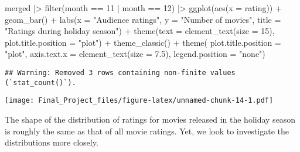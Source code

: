 \documentclass[
]{article}
\newenvironment{Shaded}{\begin{snugshade}}{\end{snugshade}}
\newcommand{\AttributeTok}[1]{\textcolor[rgb]{0.77,0.63,0.00}{#1}}
\newcommand{\DecValTok}[1]{\textcolor[rgb]{0.00,0.00,0.81}{#1}}
\newcommand{\FloatTok}[1]{\textcolor[rgb]{0.00,0.00,0.81}{#1}}
\newcommand{\FunctionTok}[1]{\textcolor[rgb]{0.00,0.00,0.00}{#1}}
\newcommand{\NormalTok}[1]{#1}
\newcommand{\SpecialCharTok}[1]{\textcolor[rgb]{0.00,0.00,0.00}{#1}}
\newcommand{\StringTok}[1]{\textcolor[rgb]{0.31,0.60,0.02}{#1}}
\begin{document}
\begin{Shaded}
\begin{Highlighting}[]
\NormalTok{merged }\SpecialCharTok{|\textgreater{}}
  \FunctionTok{filter}\NormalTok{(month }\SpecialCharTok{==} \DecValTok{11} \SpecialCharTok{|}\NormalTok{ month }\SpecialCharTok{==} \DecValTok{12}\NormalTok{) }\SpecialCharTok{|\textgreater{}}
  \FunctionTok{ggplot}\NormalTok{(}\FunctionTok{aes}\NormalTok{(}\AttributeTok{x =}\NormalTok{ rating)) }\SpecialCharTok{+}
  \FunctionTok{geom\_bar}\NormalTok{() }\SpecialCharTok{+}
  \FunctionTok{labs}\NormalTok{(}\AttributeTok{x =} \StringTok{"Audience ratings"}\NormalTok{,}
       \AttributeTok{y =} \StringTok{"Number of movies"}\NormalTok{,}
       \AttributeTok{title =} \StringTok{"Ratings during holiday season"}\NormalTok{) }\SpecialCharTok{+}
  \FunctionTok{theme}\NormalTok{(}\AttributeTok{text =} \FunctionTok{element\_text}\NormalTok{(}\AttributeTok{size =} \DecValTok{15}\NormalTok{),}
        \AttributeTok{plot.title.position =} \StringTok{"plot"}\NormalTok{) }\SpecialCharTok{+}
  \FunctionTok{theme\_classic}\NormalTok{() }\SpecialCharTok{+}
  \FunctionTok{theme}\NormalTok{(}
        \AttributeTok{plot.title.position =} \StringTok{"plot"}\NormalTok{,}
        \AttributeTok{axis.text.x =} \FunctionTok{element\_text}\NormalTok{(}\AttributeTok{size =} \FloatTok{7.5}\NormalTok{),}
        \AttributeTok{legend.position =} \StringTok{"none"}\NormalTok{)}
\end{Highlighting}
\end{Shaded}

\begin{verbatim}
## Warning: Removed 3 rows containing non-finite values (`stat_count()`).
\end{verbatim}

\texttt{[image: Final\_Project\_files/figure-latex/unnamed-chunk-14-1.pdf]}

The shape of the distribution of ratings for movies released in the
holiday season is roughly the same as that of all movie ratings. Yet, we
look to investigate the distributions more closely.
\end{document}
